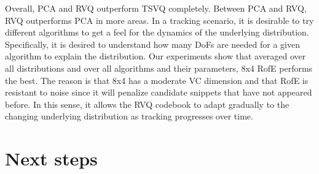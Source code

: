 Overall, PCA and RVQ outperform TSVQ completely.  Between PCA and RVQ, RVQ outperforms PCA in more areas.  In a tracking scenario, it is desirable to try different algorithms to get a feel for the dynamics of the underlying distribution.  Specifically, it is desired to understand how many DoFs are needed for a given algorithm to explain the distribution.  Our experiments show that averaged over all distributions and over all algorithms and their parameters, 8x4 RofE performs the best.  The reason is that 8x4 has a moderate VC dimension and that RofE is resistant to noise since it will penalize candidate snippets that have not appeared before.  In this sense, it allows the RVQ codebook to adapt gradually to the changing underlying distribution as tracking progresses over time.
\section{Next steps}
